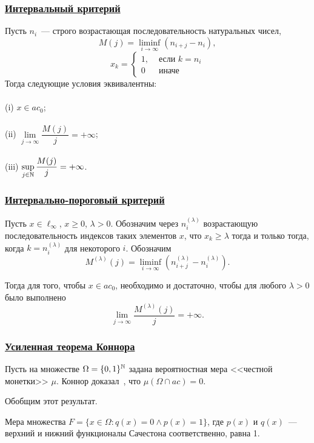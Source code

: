 \begin{frame}\frametitle{\underline{Интервальный критерий}}
		\label{thm:M_j_ac0_inf_lim}
		Пусть $n_i$~--- строго возрастающая последовательность натуральных чисел,
		\begin{equation}
			\label{eq:definition_M_j}
			M(j) = \liminf_{i\to\infty} \left(n_{i+j} - n_i\right),
		\end{equation}
		\begin{equation}
			x_k = \left\{\begin{array}{ll}
				1, & \mbox{~если~} k = n_i
				\\
				0  & \mbox{~иначе~}
			\end{array}\right.
		\end{equation}
		Тогда следующие условия эквивалентны:
		\\~\\
		(i)   $x \in ac_0$;
		\\~\\
		(ii)  $\lim\limits_{j \to \infty} \dfrac{M(j)}{j} = +\infty$;
		\\~\\
		(iii) $\sup\limits_{j \in \mathbb{N}}     \dfrac{M(j)}{j} = +\infty$.
\end{frame}


\begin{frame}\frametitle{\underline{Интервально-пороговый критерий}}
	\begin{ttheorem}
		Пусть $x\in\ell_\infty$, $x \geq 0$, $\lambda>0$.
		Обозначим через $n^{(\lambda)}_i$ возрастающую последовательность
		индексов таких элементов $x$, что $x_k \geq \lambda$ тогда и только тогда,
		когда $k=n^{(\lambda)}_i$ для некоторого $i$.
		Обозначим
		\begin{equation}
			M^{(\lambda)}(j) = \liminf_{i\to\infty} \left(n^{(\lambda)}_{i+j} - n^{(\lambda)}_i\right)
			.
		\end{equation}


		Тогда для того, чтобы $x\in ac_0$, необходимо и достаточно, чтобы
		для любого $\lambda>0$ было выполнено
		\begin{equation}
			\lim_{j \to \infty} \frac{M^{(\lambda)}(j)}{j} = +\infty
			.
		\end{equation}
	\end{ttheorem}
\end{frame}


\begin{frame}\frametitle{\underline{Усиленная теорема Коннора}}
	Пусть на множестве $\Omega=\{0,1\}^{\mathbb{N}}$ задана вероятностная мера <<честной монетки>> $\mu$.
	Коннор доказал~\cite{connor1990almost}, что $\mu(\Omega\cap ac)=0$.

	Обобщим этот результат.

	\begin{ttheorem}
	Мера множества $F=\{x\in\Omega : q(x) = 0 \wedge p(x)= 1\}$,
	где $p(x)$ и $q(x)$~--- верхний и нижний функционалы Сачестона соответственно,
	равна 1.
	\end{ttheorem}
\end{frame}


